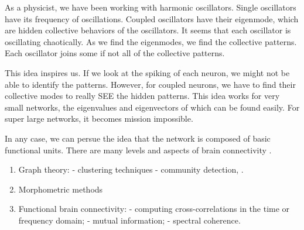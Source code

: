 \documentclass[letterpaper,10pt,english]{sphinxmanual}
\begin{document}
As a physicist, we have been working with harmonic oscillators. Single oscillators have its frequency of oscillations. Coupled oscillators have their eigenmode, which are hidden collective behaviors of the oscillators. It seems that each oscillator is oscillating chaotically. As we find the eigenmodes, we find the collective patterns. Each oscillator joins some if not all of the collective patterns.

This idea inspires us. If we look at the spiking of each neuron, we might not be able to identify the patterns. However, for coupled neurons, we have to find their collective modes to really SEE the hidden patterns. This idea works for very small networks, the eigenvalues and eigenvectors of which can be found easily. For super large networks, it becomes mission impossible.

In any case, we can persue the idea that the network is composed of basic functional units. There are many levels and aspects of brain connectivity \label{\detokenize{neuroscience/functional-connectivity:id1}}{\hyperref[\detokenize{neuroscience/functional-connectivity:brainconnectivity}]{\sphinxcrossref{{[}BrainConnectivity{]}}}}.
\begin{enumerate}
\item {} 
Graph theory:
- clustering techniques
- community detection, .

\item {} 
Morphometric methods

\item {} 
Functional brain connectivity:
- computing cross-correlations in the time or frequency domain;
- mutual information;
- spectral coherence.

\end{enumerate}
\end{document}
